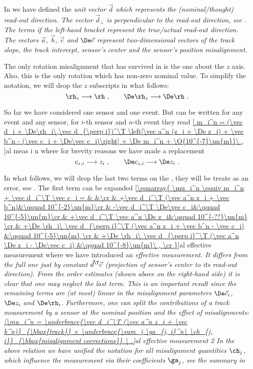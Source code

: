 In  we have defined the \em{unit} vector $\vec d$ which represents the (nominal/thought) \em{read-out direction}. The vector $\vec d_\perp$ is perpendicular to the read-out direction, see . The terms if the left-hand bracket represent the true/actual read-out direction. The vectors $\vec a$, $\vec b$, $\vec c$ and $\De \vec c$ represent two-dimensional vectors of the track slope, the track intercept, sensor's center and the sensor's position misalignment.

The only rotation misalignment that has survived in  is the one about the $z$ axis. Also, this is the only rotation which has non-zero nominal value. To simplify the notation, we will drop the $z$ subscripts in what follows:
$$\rh_z \longrightarrow \rh\ ,\qquad \De\rh_z \longrightarrow \De\rh\ .$$

So far we have considered one sensor and one event. But  can be written for any event and any sensor, for $i$-th sensor and $n$-th event they read
\eqref{
m_i^n = (\vec d_i + \De\rh_i\,\vec d_{\perp i})^\T \left[\vec a^n (z_i + \De z_i) + \vec b^n - (\vec c_i + \De\vec c_i)\right] + \De m_i^n + \O{10^{-7}\un{m}}\ ,
}{al meas i n}
where for brevity reasons we have made a replacement
$$c_{z,i} \longrightarrow z_i\ ,\qquad \De c_{z,i} \longrightarrow \De z_i\ .$$

In what follows, we will drop the last two terms on the \rhs, they will be treate as an error, see . The first term can be expanded
\eqref{\eqnarray{
\mu_i^n \equiv m_i^n + \vec d_i^\T \vec c_i = & &\cr
& +\vec d_i^\T (\vec a^n z_i + \vec b^n)&\qquad 10^{-2}\un{m}\cr
& -\vec d_i^\T \De\vec c_i&\qquad 10^{-5}\un{m}\cr
& +\vec d_i^\T \vec a^n \De z_i&\qquad 10^{-??}\un{m} \cr
& +\De \rh_i\ \vec d_{\perp i}^\T (\vec a^n z_i + \vec b^n - \vec c_i) &\qquad 10^{-5}\un{m} \cr
& +\De \rh_i\ \vec d_{\perp i}^\T (\vec a^n \De z_i - \De\vec c_i) &\qquad 10^{-8}\un{m}\ , \cr
}}{al effective measurement}
where we have introduced an \em{effective measurement}. It differs from the full one just by constant $\vec d^\T \vec c$ (projection of sensor's center to its read-out direction). From the order estimates (shown above on the right-hand side) it is clear that one may neglect the last term. This is an important result since the remaining terms are (at most) linear in the misalignment parameters $\De \vec c_i$, $\De z_i$ and $\De \rh_i$. Furthermore, one can split the contributions of a track measurement by a sensor at the nominal position and the effect of misalignments:
\eqref{\mu_i^n =
\underbrace{\vec d_i^\T (\vec a^n z_i + \vec b^n)}_{\hbox{track}}
+
\underbrace{\sum_j \ga_{j, i}^n\ \ch_{j, i}}_{\hbox{misalignment corrections}}
\ .}{al effective measurement 2}
In the above relation we have unified the notation for all misalignment quantities $\ch_j$, which influence the measurement via their coefficients $\ga_j$, see the summary in 

